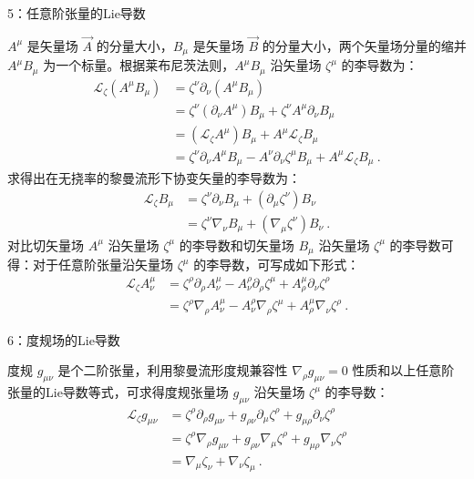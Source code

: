 5：任意阶张量的Lie导数

$A^{\mu}$ 是矢量场 $\overrightarrow{A}$ 的分量大小，$B_{\mu}$ 是矢量场 $\overrightarrow{B}$ 的分量大小，两个矢量场分量的缩并 $A^{\mu}B_{\mu}$ 为一个标量。根据莱布尼茨法则，$A^{\mu}B_{\mu}$ 沿矢量场 $\zeta^{\mu}$ 的李导数为：
$$\begin{aligned}
\mathcal{L}_{\zeta}\left(A^{\mu} B_{\mu}\right) &=\zeta^{\nu} \partial_{\nu}\left(A^{\mu} B_{\mu}\right) \\
&=\zeta^{\nu} (\partial_{\nu} A^{\mu}) B_{\mu}+\zeta^{\nu} A^{\mu} \partial_{\nu} B_{\mu} \\
&=(\mathcal{L}_{\zeta} A^{\mu}) B_{\mu}+A^{\mu} \mathcal{L}_{\zeta} B_{\mu} \\
&=\zeta^{\nu} \partial_{\nu} A^{\mu} B_{\mu}-A^{\nu} \partial_{\nu} \zeta^{\mu} B_{\mu}+A^{\mu} \mathcal{L}_{\zeta} B_{\mu }~.
\end{aligned}$$
求得出在无挠率的黎曼流形下协变矢量的李导数为：
$$\begin{aligned}
\mathcal{L}_{\zeta} B_{\mu} &=\zeta^{\nu} \partial_{\nu} B_{\mu}+(\partial_{\mu} \zeta^{\nu}) B_{\nu} \\
&=\zeta^{\nu} \nabla_{\nu} B_{\mu}+(\nabla_{\mu} \zeta^{\nu}) B_{\nu}~.
\end{aligned}$$
对比切矢量场 $A^{\mu}$ 沿矢量场 $\zeta^{\mu}$ 的李导数和切矢量场 $B_{\mu}$ 沿矢量场 $\zeta^{\mu}$ 的李导数可得：对于任意阶张量沿矢量场 $\zeta^{\mu}$ 的李导数，可写成如下形式：
$$\begin{aligned}
\mathcal{L}_{\zeta} A_{\nu}^{\mu} &=\zeta^{\rho} \partial_{\rho} A_{\nu}^{\mu}-A_{\nu}^{\rho} \partial_{\rho} \zeta^{\mu}+A_{\rho}^{\mu} \partial_{\nu} \zeta^{\rho} \\
&=\zeta^{\rho} \nabla_{\rho} A_{\nu}^{\mu}-A_{\nu}^{\rho} \nabla_{\rho} \zeta^{\mu}+A_{\rho}^{\mu} \nabla_{\nu} \zeta^{\rho}~.
\end{aligned}$$

6：度规场的Lie导数

度规 $g_{\mu \nu}$ 是个二阶张量，利用黎曼流形度规兼容性 $\nabla_{\rho} g_{\mu \nu}=0$ 性质和以上任意阶张量的Lie导数等式，可求得度规张量场 $g_{\mu \nu}$ 沿矢量场 $\zeta^{\mu}$ 的李导数：
$$\begin{aligned}
\mathcal{L}_{\zeta} g_{\mu \nu} 
&=\zeta^{\rho} \partial_{\rho} g_{\mu \nu}+g_{\rho \nu} \partial_{\mu} \zeta^{\rho}+g_{\mu \rho} \partial_{\nu} \zeta^{\rho} \\
&=\zeta^{\rho} \nabla_{\rho} g_{\mu \nu}+g_{\rho \nu} \nabla_{\mu} \zeta^{\rho}+g_{\mu \rho} \nabla_{\nu} \zeta^{\rho} \\
&=\nabla_{\mu} \zeta_{\nu}+\nabla_{\nu} \zeta_{\mu} ~.
\end{aligned}$$

